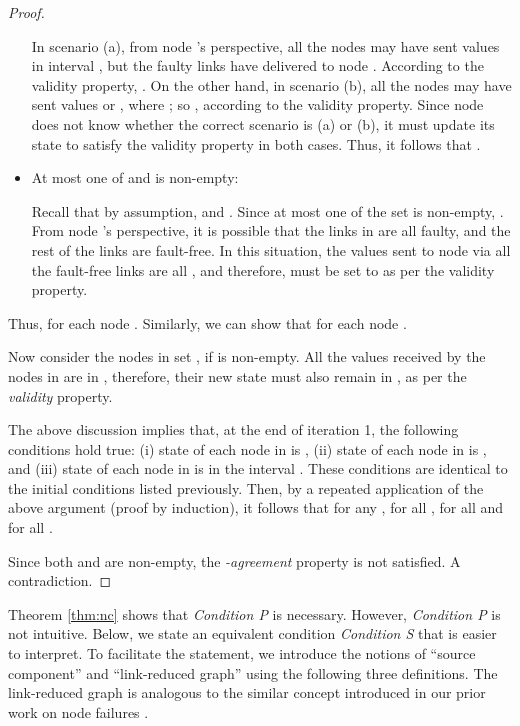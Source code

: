 \documentclass{llncs}
\newcommand{\fillbox}{\hspace*{\fill}}
\begin{document}
\begin{proof}
\begin{itemize}
In scenario (a), from node 's perspective, all the nodes may have sent values
in interval , but the faulty links have delivered  to node . According to the validity
property, . On the other hand, in scenario (b), all the
nodes may have sent values  or , where ; so , according to
the validity property. Since node  does not know whether the
correct scenario is (a) or (b), it must update its state to satisfy the
validity property in both cases. Thus, it follows that .

\item
At most one of  and  is non-empty: 

Recall that by assumption,  and . Since at most one of the set is non-empty, 
.
From node 's perspective,
it is possible that the links in  are all faulty,
and the rest of the links are fault-free. 
In this situation, the values sent to node  via all the fault-free links are all , and therefore,  must be set to 
as per the validity property.

\end{itemize}
Thus,  for each node .
Similarly, we can show that  for each node .

Now consider the nodes in set , if  is non-empty.
All the values received by the nodes in  are in , therefore,
their new state must also remain in , as per the {\em validity} property.

The above discussion implies that, at the end of iteration 1,
the following conditions hold true: (i) state of each node in  is
, (ii) state of each node in  is , and (iii) state of each node
in  is in the interval . These conditions are identical to the initial conditions
listed previously. Then, by a repeated application of the above
argument (proof by induction), it follows that for
any ,  for all , 
for all  and  for all .

Since both  and  are non-empty, the {\em -agreement} property
is not satisfied. A contradiction.
\fillbox
\end{proof}








Theorem \ref{thm:nc} shows that {\em Condition P} is necessary. However, {\em Condition P} is not intuitive. Below, we state an equivalent condition {\em Condition S} that is
easier to interpret. To facilitate the
statement, we introduce the notions of ``source component'' and ``link-reduced graph'' using the following three definitions. The link-reduced graph is analogous to the similar concept introduced in our prior work on node failures \cite{vaidya_PODC12,Tseng_general,vaidya_icdcn14}. 
\end{document}
